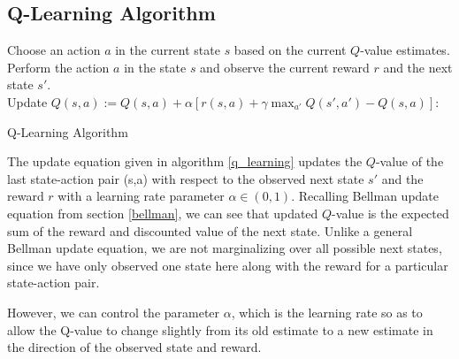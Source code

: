 \documentclass[12pt]{report}
\begin{document}
\subsection{Q-Learning Algorithm}
\begin{algorithm}
{Choose an action $a$ in the current state $s$ based on the current $Q$-value estimates.\\
Perform the action $a$ in the state $s$ and observe the current reward $r$ and the next state $s'$.\\
Update $Q(s,a) := Q(s,a) + \alpha [r(s,a) + \gamma \max_{a'}Q(s',a') - Q(s,a)]$:
}
\caption{Q-Learning Algorithm}\label{q_learning}
\end{algorithm}
The update equation given in algorithm \ref{q_learning} updates the $Q$-value of the last state-action pair (s,a) with respect to the observed next state $s'$ and the reward $r$ with a learning rate parameter $\alpha \in (0,1)$. Recalling Bellman update equation from section \ref{bellman}, we can see that updated $Q$-value is the expected sum of the reward and discounted value of the next state. Unlike a general Bellman update equation, we are not marginalizing over all possible next states, since we have only observed one state here along with the reward for a particular state-action pair.\par 
However, we can control the parameter $\alpha$, which is the learning rate so as to allow the Q-value to change slightly from its old estimate to a new estimate in the direction of the observed state and reward.
\end{document}
